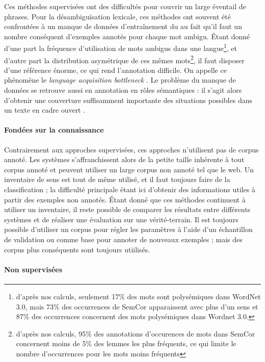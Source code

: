 Ces méthodes supervisées ont des difficultés pour couvrir un large éventail de
phrases. Pour la désambiguïsation lexicale, ces méthodes ont souvent été
confrontées à un manque de données d'entraînement du au fait qu'il faut un
nombre conséquent d'exemples annotés pour chaque mot ambigu. Étant donné d'une
part la fréquence d'utilisation de mots ambigus dans une
langue\footnote{d'après nos calculs, seulement 17\% des mots sont polysémiques
    dans WordNet 3.0, mais 73\% des occurrences de SemCor apparaissent avec
    plus d'un sens et 87\% des occurrences concernent des mots polysémiques
dans Wordnet 3.0.}, et d'autre part la distribution asymétrique de ces mêmes
mots\footnote{d'après nos calculs, 95\% des annotations d'occurences de mots
    dans SemCor concernent moins de 5\% des lemmes les plus fréquents, ce qui
limite le nombre d'occurrences pour les mots moins fréquents}, il faut disposer
d'une référence énorme, ce qui rend l'annotation difficile. On appelle ce
phénomène le \textit{language acquisition bottleneck} \citep{gale1992using}. Le
problème du manque de données se retrouve aussi en annotation en rôles
sémantiques : il s'agit alors d'obtenir une couverture suffisamment importante
des situations possibles dans un texte en cadre ouvert
\cite[p.~155]{marquez2008semantic}.

\paragraph{Fondées sur la connaissance}

Contrairement aux approches supervisées, ces approches n'utilisent pas de
corpus annoté. Les systèmes s'affranchissent alors de la petite taille
inhérente à tout corpus annoté et peuvent utiliser un large corpus non annoté
tel que le web. Un inventaire de sens est tout de même utilisé, et il faut
toujours faire de la classification ; la difficulté principale étant ici
d'obtenir des informations utiles à partir des exemples non annotés. Étant
donné que ces méthodes continuent à utiliser un inventaire, il reste possible
de comparer les résultats entre différents systèmes et de réaliser une
évaluation sur une vérité-terrain. Il est toujours possible d'utiliser un
corpus pour régler les paramètres à l'aide d'un échantillon de validation ou
comme base pour annoter de nouveaux exemples ; mais des corpus plus conséquents
sont toujours utiilisés.

\paragraph{Non supervisées}

